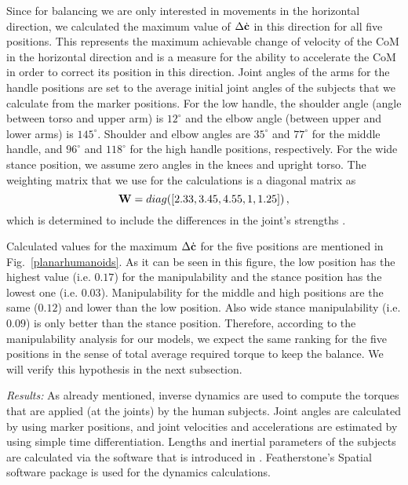 Since for balancing we are only interested in movements in the horizontal direction, we calculated the maximum value of $\Delta \dot{\mathbf{c}}$ in this direction for all five positions. This represents the maximum achievable change of velocity of the CoM in the horizontal direction and is a measure for the ability to accelerate the CoM in order to correct its position in this direction. Joint angles of the arms for the handle positions are set to the average initial joint angles of the subjects that we calculate from the marker positions. For the low handle, the shoulder angle (angle between torso and upper arm) is $12^\circ$ and the elbow angle (between upper and lower arms) is $145^\circ$. Shoulder and elbow angles are $35^\circ$ and $77^\circ$ for the middle handle, and $96^\circ$ and $118^\circ$ for the high handle positions, respectively. For the wide stance position, we assume zero angles in the knees and upright torso. The weighting matrix that we use for the calculations is a diagonal matrix as
%
\begin{equation}
\mathbf{W} = diag([2.33, 3.45, 4.55, 1, 1.25]) \, ,
\end{equation}
%
which is determined to include the differences in the joint's strengths \cite{Anderson2007, Bober2002, Gandevia1998, Moraux2013}.

Calculated values for the maximum $\Delta \dot{\mathbf{c}}$ for the five positions are mentioned in Fig.~\ref{planarhumanoids}. As it can be seen in this figure, the low position has the highest value (i.e. $0.17$) for the manipulability and the stance position has the lowest one (i.e. $0.03$). Manipulability for the middle and high positions are the same ($0.12$) and lower than the low position. Also wide stance manipulability (i.e. $0.09$) is only better than the stance position. Therefore, according to the manipulability analysis for our models, we expect the same ranking for the five positions in the sense of total average required torque to keep the balance. We will verify this hypothesis in the next subsection.


\textit{Results:} As already mentioned, inverse dynamics are used to compute the torques that are applied (at the joints) by the human subjects. Joint angles are calculated by using marker positions, and joint velocities and accelerations are estimated by using simple time differentiation. Lengths and inertial parameters of the subjects are calculated via the software that is introduced in \cite{Zlajpah&Babic14}. Featherstone's Spatial software package \cite{Featherstone} is used for the dynamics calculations.


